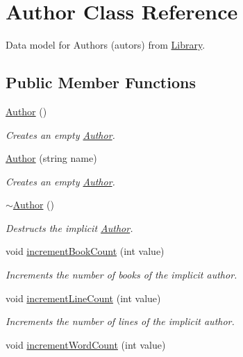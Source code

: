 \hypertarget{class_author}{}\section{Author Class Reference}
\label{class_author}


Data model for Authors (autors) from \hyperlink{class_library}{Library}.  


\subsection*{Public Member Functions}
\begin{DoxyCompactItemize}
\item 
\hyperlink{class_author_a5f7059590a8e823fe0713faf66126b17}{Author} ()
\begin{DoxyCompactList}\small\item\em Creates an empty \hyperlink{class_author}{Author}. \end{DoxyCompactList}\item 
\hyperlink{class_author_a4a8afd3af0d6f7492bd04dcd44dc9f95}{Author} (string name)
\begin{DoxyCompactList}\small\item\em Creates an empty \hyperlink{class_author}{Author}. \end{DoxyCompactList}\item 
\hyperlink{class_author_ae1d4db056b321487cf7c07a2045d4a2d}{$\sim$\+Author} ()
\begin{DoxyCompactList}\small\item\em Destructs the implicit \hyperlink{class_author}{Author}. \end{DoxyCompactList}\item 
void \hyperlink{class_author_afa8dc68382f3e9828112ed440c3677d3}{increment\+Book\+Count} (int value)
\begin{DoxyCompactList}\small\item\em Increments the number of books of the implicit author. \end{DoxyCompactList}\item 
void \hyperlink{class_author_a73814ef0d8d840880415c4020a4d5bf9}{increment\+Line\+Count} (int value)
\begin{DoxyCompactList}\small\item\em Increments the number of lines of the implicit author. \end{DoxyCompactList}\item 
void \hyperlink{class_author_af12d32bb751a9ac3e1508631e4d8fb8e}{increment\+Word\+Count} (int value)

\end{DoxyCompactItemize}
